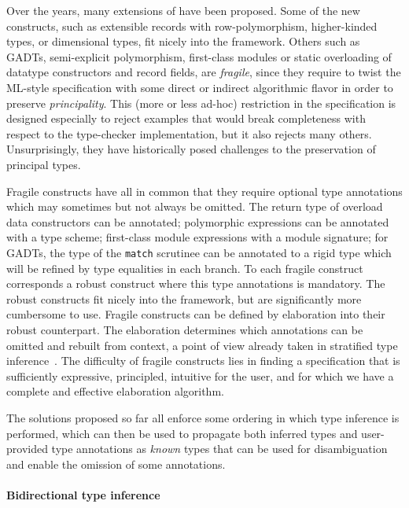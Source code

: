 \documentclass[acmsmall,screen,nonacm]{acmart}
\begin{document}
Over the years, many extensions of \ML have been proposed. Some of the
new constructs, such as extensible records with row-polymorphism,
higher-kinded types, or dimensional types, fit nicely into the \ML
framework. Others such as GADTs, semi-explicit polymorphism,
first-class modules or static overloading of datatype constructors and
record fields, are \emph{fragile}, since they require to twist the
ML-style specification with some direct or indirect algorithmic flavor
in order to preserve \emph{principality}. This (more or less ad-hoc)
restriction in the specification is designed especially to reject
examples that would break completeness with respect to the
type-checker implementation, but it also rejects many
others.
Unsurprisingly, they have historically posed challenges to the
preservation of principal types.

Fragile constructs have all in common that they require optional
type annotations which may sometimes but not always be
omitted. The return type of overload data constructors can be
annotated; polymorphic expressions can be annotated with a type
scheme; first-class module expressions with a module signature; for
GADTs, the type of the \texttt{match} scrutinee can be annotated to
a rigid type which will be refined by type equalities in each
branch. To each fragile construct corresponds a robust construct where
this type annotations is mandatory. The robust constructs fit nicely into
the \ML
framework, but are significantly more cumbersome to use. Fragile
constructs can be defined by elaboration into their robust
counterpart. The elaboration determines which annotations can be
omitted and rebuilt from context, a point of view already taken in
stratified type inference~\cite
{Pottier-Regis-Gianas/stratified@popl06}.
%
The difficulty of fragile constructs lies in finding a specification
that is sufficiently expressive, principled, intuitive for the user,
and for which we have a complete and effective elaboration algorithm.

The solutions proposed so far all enforce some ordering in which type
inference is performed, which can then be used to propagate both inferred
types and user-provided type annotations as \emph{known} types that can be
used for disambiguation and enable the omission of some annotations.

\paragraph{Bidirectional type inference}
\end{document}
